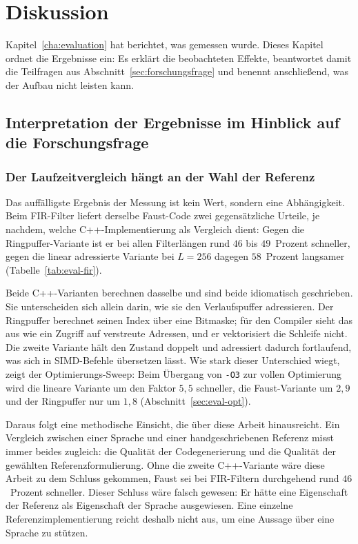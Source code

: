 \chapter{Diskussion}
\label{cha:diskussion}

Kapitel~\ref{cha:evaluation} hat berichtet, was gemessen wurde. Dieses Kapitel ordnet die Ergebnisse ein: Es erklärt die beobachteten Effekte, beantwortet damit die Teilfragen aus Abschnitt~\ref{sec:forschungsfrage} und benennt anschließend, was der Aufbau nicht leisten kann.

\section{Interpretation der Ergebnisse im Hinblick auf die Forschungsfrage}
\label{sec:interpretation}

\subsection{Der Laufzeitvergleich hängt an der Wahl der Referenz}
\label{subsec:disk-referenz}

Das auffälligste Ergebnis der Messung ist kein Wert, sondern eine Abhängigkeit. Beim FIR-Filter liefert derselbe Faust-Code zwei gegensätzliche Urteile, je nachdem, welche C++-Implementierung als Vergleich dient: Gegen die Ringpuffer-Variante ist er bei allen Filterlängen rund $46$ bis $49$~Prozent schneller, gegen die linear adressierte Variante bei $L=256$ dagegen $58$~Prozent langsamer (Tabelle~\ref{tab:eval-fir}).

Beide C++-Varianten berechnen dasselbe und sind beide idiomatisch geschrieben. Sie unterscheiden sich allein darin, wie sie den Verlaufspuffer adressieren. Der Ringpuffer berechnet seinen Index über eine Bitmaske; für den Compiler sieht das aus wie ein Zugriff auf verstreute Adressen, und er vektorisiert die Schleife nicht. Die zweite Variante hält den Zustand doppelt und adressiert dadurch fortlaufend, was sich in SIMD-Befehle übersetzen lässt. Wie stark dieser Unterschied wiegt, zeigt der Optimierungs-Sweep: Beim Übergang von \texttt{-O3} zur vollen Optimierung wird die lineare Variante um den Faktor $5{,}5$ schneller, die Faust-Variante um $2{,}9$ und der Ringpuffer nur um $1{,}8$ (Abschnitt~\ref{sec:eval-opt}).

Daraus folgt eine methodische Einsicht, die über diese Arbeit hinausreicht. Ein Vergleich zwischen einer Sprache und einer handgeschriebenen Referenz misst immer beides zugleich: die Qualität der Codegenerierung und die Qualität der gewählten Referenzformulierung. Ohne die zweite C++-Variante wäre diese Arbeit zu dem Schluss gekommen, Faust sei bei FIR-Filtern durchgehend rund $46$~Prozent schneller. Dieser Schluss wäre falsch gewesen: Er hätte eine Eigenschaft der Referenz als Eigenschaft der Sprache ausgewiesen. Eine einzelne Referenzimplementierung reicht deshalb nicht aus, um eine Aussage über eine Sprache zu stützen.

